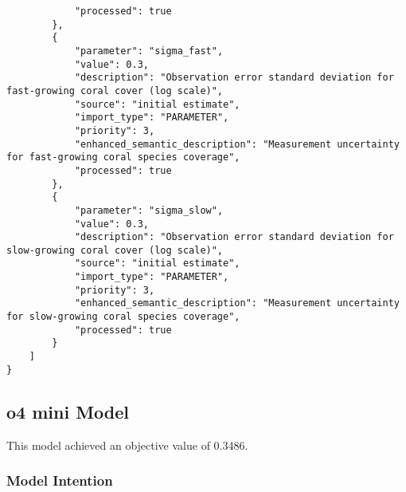 \begin{lstlisting}
            "processed": true
        },
        {
            "parameter": "sigma_fast",
            "value": 0.3,
            "description": "Observation error standard deviation for fast-growing coral cover (log scale)",
            "source": "initial estimate",
            "import_type": "PARAMETER",
            "priority": 3,
            "enhanced_semantic_description": "Measurement uncertainty for fast-growing coral species coverage",
            "processed": true
        },
        {
            "parameter": "sigma_slow",
            "value": 0.3,
            "description": "Observation error standard deviation for slow-growing coral cover (log scale)",
            "source": "initial estimate",
            "import_type": "PARAMETER",
            "priority": 3,
            "enhanced_semantic_description": "Measurement uncertainty for slow-growing coral species coverage",
            "processed": true
        }
    ]
}
\end{lstlisting}
\clearpage
\subsection{o4 mini Model}
This model achieved an objective value of 0.3486.

\subsubsection{Model Intention}
\begin{lstlisting}
\end{lstlisting}

